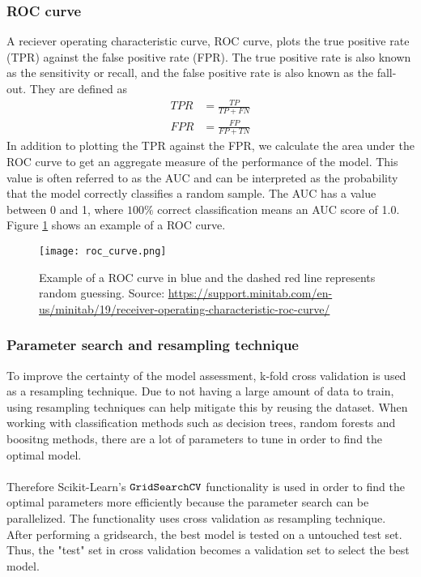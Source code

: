 \documentclass[a4paper,twocolumn]{article}
\begin{document}
\subsubsection{ROC curve}
A reciever operating characteristic curve, ROC curve, plots the true positive rate (TPR) against the false positive rate (FPR). The true positive rate is also known as the sensitivity or recall, and the false positive rate is also known as the fall-out. They are defined as
\begin{align}
    TPR &= \frac{TP}{TP + FN}\\
    FPR &= \frac{FP}{FP + TN}
\end{align}
In addition to plotting the TPR against the FPR, we calculate the area under the ROC curve to get an aggregate measure of the performance of the model. This value is often referred to as the AUC and can be interpreted as the probability that the model correctly classifies a random sample. The AUC has a value between 0 and 1, where $100\%$ correct classification means an AUC score of 1.0. Figure \ref{fig:4} shows an example of a ROC curve.
\begin{figure}[ht]
    \centering
    \texttt{[image: roc\_curve.png]}
    \caption{Example of a ROC curve in blue and the dashed red line represents random guessing. Source: \href{https://support.minitab.com/en-us/minitab/19/help-and-how-to/statistical-modeling/regression/how-to/fit-binary-logistic-model/interpret-the-results/all-statistics-and-graphs/receiver-operating-characteristic-roc-curve/}{https://support.minitab.com/en-us/minitab/19/receiver-operating-characteristic-roc-curve/}}
    \label{fig:4}
\end{figure}
\subsubsection{Parameter search and resampling technique}
To improve the certainty of the model assessment, k-fold cross validation is used as a resampling technique. Due to not having a large amount of data to train, using resampling techniques can help mitigate this by reusing the dataset. When working with classification methods such as decision trees, random forests and boositng methods, there are a lot of parameters to tune in order to find the optimal model. \\
\\
Therefore Scikit-Learn's $\verb"GridSearchCV"$ functionality is used in order to find the optimal parameters more efficiently because the parameter search can be parallelized. The functionality uses cross validation as resampling technique. After performing a gridsearch, the best model is tested on a untouched test set. Thus, the "test" set in cross validation becomes a validation set to select the best model.
\end{document}
